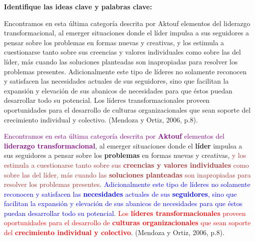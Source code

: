\documentclass[
11pt, %
]{beamer}
\begin{document}
\begin{frame}
	\textbf{Identifique las ideas clave y palabras clave:}
	\begin{block}{} %

		Encontramos en esta última categoría descrita por Aktouf elementos del liderazgo transformacional, al emerger situaciones donde el líder impulsa a sus seguidores a pensar sobre los problemas en formas nuevas y creativas, y los estimula a cuestionarse tanto sobre sus creencias y valores individuales como sobre las del líder, más cuando las soluciones planteadas son inapropiadas para resolver los problemas presentes. Adicionalmente este tipo de líderes no solamente reconocen y satisfacen las necesidades actuales de sus seguidores, sino que facilitan la expansión y elevación de sus abanicos de necesidades para que éstos puedan desarrollar todo su potencial. Los líderes transformacionales proveen oportunidades para el desarrollo de culturas organizacionales que sean soporte del crecimiento individual y colectivo. (Mendoza y Ortiz, 2006, p.8).
	\end{block}
\end{frame}

\begin{frame}
	\begin{block}{} %
		\textcolor{purple}{Encontramos en esta última categoría descrita por \textbf{Aktouf} elementos del \textbf{liderazgo transformacional}}, al emerger situaciones donde el \textbf{líder} impulsa a sus seguidores a pensar sobre los \textbf{problemas} en formas nuevas y creativas, \textcolor{brown}{y los estimula a cuestionarse tanto sobre sus \textbf{creencias y valores individuales} como sobre las del líder, más cuando las \textbf{soluciones planteadas} son inapropiadas para resolver los problemas presentes}. \textcolor{blue}{Adicionalmente este tipo de líderes no solamente reconocen y satisfacen las \textbf{necesidades} actuales de sus \textbf{seguidores}, sino que facilitan la expansión y elevación de sus abanicos de necesidades para que éstos puedan desarrollar todo su potencial}. \textcolor{red}{Los \textbf{líderes transformacionales} proveen oportunidades para el desarrollo de \textbf{culturas organizacionales} que sean soporte del \textbf{crecimiento individual y colectivo}}. (Mendoza y Ortiz, 2006, p.8).
	\end{block}
\end{frame}
\end{document}
